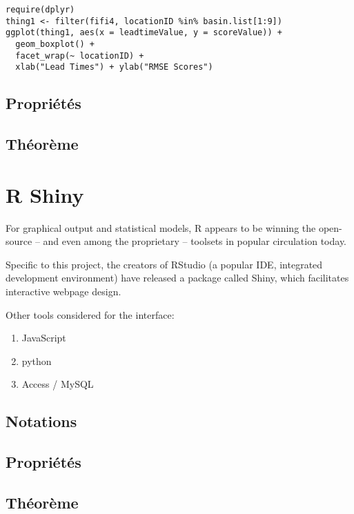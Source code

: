 \documentclass[logos,parttoc,morelanguage=french,morelanguage=italian]{orsay-memoire}
\begin{document}
{\begin{verbatim}
require(dplyr)
thing1 <- filter(fifi4, locationID %in% basin.list[1:9])
ggplot(thing1, aes(x = leadtimeValue, y = scoreValue)) +
  geom_boxplot() +
  facet_wrap(~ locationID) +
  xlab("Lead Times") + ylab("RMSE Scores")
\end{verbatim}




\subsection{Propriétés}

\dummytext

\subsection{Théorème}

\dummytext

\section{R Shiny}

For graphical output and statistical models, R appears to be winning the open-source -- and even among the proprietary -- toolsets in popular circulation today.

Specific to this project, the creators of RStudio (a popular IDE, integrated development environment) have released a package called Shiny, which facilitates interactive webpage design.

Other tools considered for the interface:
\begin{enumerate}
	\item JavaScript
    \item python
    \item Access / MySQL
\end{enumerate}


\subsection{Notations}


\subsection{Propriétés}

\dummytext

\subsection{Théorème}

}
\end{document}
